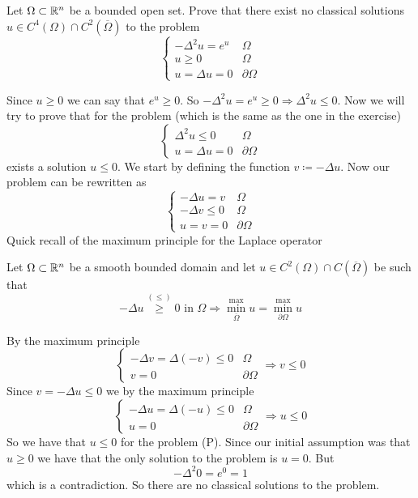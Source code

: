 \newpage
\begin{exercise}
    Let \(\Omega \subset \mathbb{R}^n\) be a bounded open set. Prove that there exist no classical solutions \(u \in C^4(\Omega) \cap C^2(\overline{\Omega})\) to the problem
    \[
        \begin{cases}
            -\Delta^2 u = e^u & \Omega         \\
            u \geq 0          & \Omega         \\
            u = \Delta u = 0  & \partial\Omega
        \end{cases}
    \]
\end{exercise}
Since \(u \geq 0\) we can say that \(e^u \geq 0\). So \(- \Delta^2 u = e^u \geq 0 \Rightarrow \Delta^2 u \leq 0\). Now we will try to prove that for the problem (which is the same as the one in the exercise)
\[
    \begin{cases}
        \Delta^2 u \leq 0 & \Omega         \\
        u = \Delta u = 0  & \partial\Omega
    \end{cases}
    \tag*{(P)}
\]
exists a solution \(u \leq 0\). We start by defining the function \(v \coloneqq
-\Delta u\). Now our problem can be rewritten as
\[
    \begin{cases}
        -\Delta u = v    & \Omega         \\
        -\Delta v \leq 0 & \Omega         \\
        u = v = 0        & \partial\Omega
    \end{cases}
\]
Quick recall of the maximum principle for the Laplace operator
\begin{remark}
    Let \(\Omega \subset \mathbb{R}^n\) be a smooth bounded domain and let \(u \in C^2(\Omega) \cap C(\overline{\Omega})\) be such that \[-\Delta u \overset{(\leq)}{\geq} 0 \text{ in } \Omega \Rightarrow \overset{\max}{\min_{\overline{\Omega}}} u = \overset{\max}{\min_{\partial\Omega}} u\]
\end{remark}
By the maximum principle
\[
    \begin{cases}
        -\Delta v = \Delta (- v) \leq 0 & \Omega         \\
        v = 0                           & \partial\Omega
    \end{cases}
    \Rightarrow v \leq 0
\]
Since \(v = -\Delta u \leq 0\) we by the maximum principle
\[
    \begin{cases}
        -\Delta u = \Delta(-u) \leq 0 & \Omega         \\
        u = 0                         & \partial\Omega
    \end{cases}
    \Rightarrow u \leq 0
\]
So we have that \(u \leq 0\) for the problem (P). Since our initial assumption
was that \(u \geq 0\) we have that the only solution to the problem is \(u =
0\). But
\[
    -\Delta^2 0 = e^0 = 1
\]
which is a contradiction. So there are no classical solutions to the problem.

